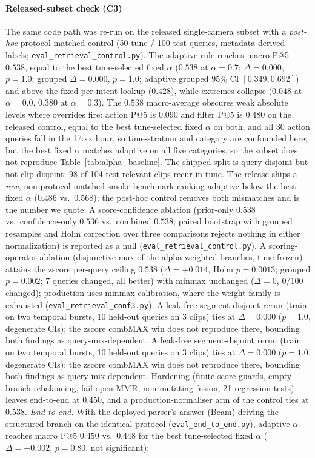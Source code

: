 ﻿\documentclass[conference]{IEEEtran}
\theoremstyle{plain}
\begin{document}
\paragraph*{Released-subset check (C3)} The same code path was re-run on the released single-camera subset with a \emph{post-hoc} protocol-matched control (50 tune / 100 test queries, metadata-derived labels; \texttt{eval\_\allowbreak retrieval\_\allowbreak control.py}). The adaptive rule reaches macro P@5 $0.538$, equal to the best tune-selected fixed $\alpha$ ($0.538$ at $\alpha=0.7$; $\Delta=0.000$, $p=1.0$; grouped $\Delta{=}0.000$, $p{=}1.0$; adaptive grouped 95\% CI $[0.349,0.692]$) and above the fixed per-intent lookup ($0.428$), while extremes collapse ($0.048$ at $\alpha=0.0$, $0.380$ at $\alpha=0.3$). The $0.538$ macro-average obscures weak absolute levels where overrides fire: action P@5 is $0.090$ and filter P@5 is $0.480$ on the released control, equal to the best tune-selected fixed $\alpha$ on both, and all 30 action queries fall in the 17:xx hour, so time-stratum and category are confounded here; but the best fixed $\alpha$ matches adaptive on all five categories, so the subset does not reproduce Table~\ref{tab:alpha_baseline}. The shipped split is query-disjoint but not clip-disjoint: 98 of 104 test-relevant clips recur in tune. The release ships a \emph{raw}, non-protocol-matched smoke benchmark ranking adaptive below the best fixed $\alpha$ ($0.486$ vs.\ $0.568$); the post-hoc control removes both mismatches and is the number we quote. A score-confidence ablation (prior-only $0.538$ vs.\ confidence-only $0.536$ vs.\ combined $0.538$; paired bootstrap with grouped resamples and Holm correction over three comparisons rejects nothing in either normalization) is reported as a null (\texttt{eval\_\allowbreak retrieval\_\allowbreak control.py}). A scoring-operator ablation (disjunctive max of the alpha-weighted branches, tune-frozen) attains the zscore per-query ceiling $0.538$ ($\Delta{=}+0.014$, Holm $p{=}0.0013$; grouped $p{=}0.002$; 7 queries changed, all better) with minmax unchanged ($\Delta{=}0$, 0/100 changed); production uses minmax calibration, where the weight family is exhausted (\texttt{eval\_\allowbreak retrieval\_conf3.py}). A leak-free segment-disjoint rerun (train on two temporal bursts, 10 held-out queries on 3 clips) ties at $\Delta{=}0.000$ ($p{=}1.0$, degenerate CIs); the zscore combMAX win does not reproduce there, bounding both findings as query-mix-dependent. A leak-free segment-disjoint rerun (train on two temporal bursts, 10 held-out queries on 3 clips) ties at $\Delta{=}0.000$ ($p{=}1.0$, degenerate CIs); the zscore combMAX win does not reproduce there, bounding both findings as query-mix-dependent. Hardening (finite-score guards, empty-branch rebalancing, fail-open MMR, non-mutating fusion; 21 regression tests) leaves end-to-end at 0.450, and a production-normaliser arm of the control ties at 0.538. \emph{End-to-end.} With the deployed parser's answer (Beam) driving the structured branch on the identical protocol (\texttt{eval\_\allowbreak end\_\allowbreak to\_\allowbreak end.py}), adaptive-$\alpha$ reaches macro P@5 $0.450$ vs.\ $0.448$ for the best tune-selected fixed $\alpha$ ($\Delta{=}+0.002$, $p{=}0.80$, not significant); 
\end{document}
